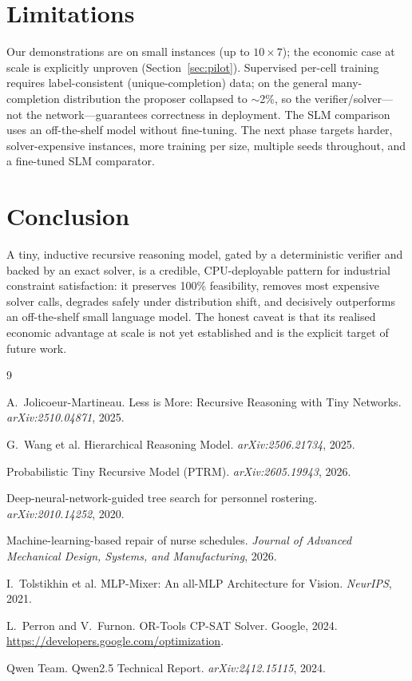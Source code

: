 \documentclass{article}
\begin{document}
\section{Limitations}

Our demonstrations are on small instances (up to $10\times7$); the economic case
at scale is explicitly unproven (Section~\ref{sec:pilot}). Supervised per-cell
training requires label-consistent (unique-completion) data; on the general
many-completion distribution the proposer collapsed to $\sim$2\%, so the
verifier/solver---not the network---guarantees correctness in deployment. The SLM
comparison uses an off-the-shelf model without fine-tuning. The next phase targets
harder, solver-expensive instances, more training per size, multiple seeds
throughout, and a fine-tuned SLM comparator.

\section{Conclusion}

A tiny, inductive recursive reasoning model, gated by a deterministic verifier and
backed by an exact solver, is a credible, CPU-deployable pattern for industrial
constraint satisfaction: it preserves 100\% feasibility, removes most expensive
solver calls, degrades safely under distribution shift, and decisively outperforms
an off-the-shelf small language model. The honest caveat is that its realised
economic advantage at scale is not yet established and is the explicit target of
future work.

\begin{thebibliography}{9}

A.~Jolicoeur-Martineau.
\newblock Less is More: Recursive Reasoning with Tiny Networks.
\newblock \emph{arXiv:2510.04871}, 2025.

G.~Wang et al.
\newblock Hierarchical Reasoning Model.
\newblock \emph{arXiv:2506.21734}, 2025.

Probabilistic Tiny Recursive Model (PTRM).
\newblock \emph{arXiv:2605.19943}, 2026.

Deep-neural-network-guided tree search for personnel rostering.
\newblock \emph{arXiv:2010.14252}, 2020.

Machine-learning-based repair of nurse schedules.
\newblock \emph{Journal of Advanced Mechanical Design, Systems, and Manufacturing},
2026.

I.~Tolstikhin et al.
\newblock MLP-Mixer: An all-MLP Architecture for Vision.
\newblock \emph{NeurIPS}, 2021.

L.~Perron and V.~Furnon.
\newblock OR-Tools CP-SAT Solver.
\newblock Google, 2024. \url{https://developers.google.com/optimization}.

Qwen Team.
\newblock Qwen2.5 Technical Report.
\newblock \emph{arXiv:2412.15115}, 2024.

\end{thebibliography}
\end{document}
